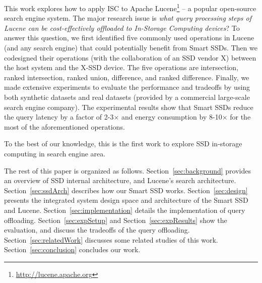 This work explores how to apply ISC to Apache Lucene\footnote{\small\url{http://lucene.apache.org}} -- a popular open-source search engine system.
The major research issue is \emph{what query processing steps of Lucene can be cost-effectively offloaded to In-Storage Computing devices}?
To answer this question, we first identified five commonly used operations in Lucene (and any search engine) that could potentially benefit from Smart SSDs. Then we codesigned their operations (with the collaboration of an SSD vendor X) between the host system and the X-SSD device. The five operations are \textsf{intersection}, \textsf{ranked intersection}, \textsf{ranked union}, \textsf{difference}, and \textsf{ranked difference}.
Finally, we made extensive experiments to evaluate the performance and tradeoffs by using both synthetic datasets and real datasets (provided by a commercial large-scale search engine company). The experimental results show that Smart SSDs reduce the query latency by a factor of 2-3$\times$ and energy consumption by 8-10$\times$ for the most of the aforementioned operations.

To the best of our knowledge, this is the first work to explore SSD in-storage computing in search engine area.


The rest of this paper is organized as follows.
Section~\ref{sec:background} provides an overview of SSD internal architecture, and Lucene's search architecture.
Section~\ref{sec:ssdArch} describes how our Smart SSD works.
Section~\ref{sec:design} presents the integrated system design space and architecture of the Smart SSD and Lucene.
Section~\ref{sec:implementation} details the implementation of query offloading.
Section~\ref{sec:expSetup} and Section~\ref{sec:expResults} show the evaluation, and discuss the tradeoffs of the query offloading.
Section~\ref{sec:relatedWork} discusses some related studies of this work.
Section~\ref{sec:conclusion} concludes our work.

